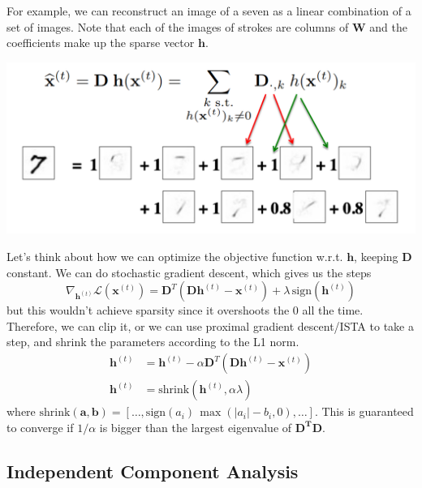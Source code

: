 \documentclass{article}
\begin{document}
    For example, we can reconstruct an image of a seven as a linear combination of a set of images. Note that each of the images of strokes are columns of $\mathbf{W}$ and the coefficients make up the sparse vector $\mathbf{h}$. 
    \begin{center}
        \includegraphics[scale=0.4]{img/sparse_coding.png}
    \end{center}
    Let's think about how we can optimize the objective function w.r.t. $\mathbf{h}$, keeping $\mathbf{D}$ constant. We can do stochastic gradient descent, which gives us the steps
    \[\nabla_{\mathbf{h}^{(t)}} \mathcal{L}(\mathbf{x}^{(t)}) = \mathbf{D}^T (\mathbf{D} \mathbf{h}^{(t)} - \mathbf{x}^{(t)}) + \lambda \, \mathrm{sign}(\mathbf{h}^{(t)})\]
    but this wouldn't achieve sparsity since it overshoots the $0$ all the time. Therefore, we can clip it, or we can use proximal gradient descent/ISTA to take a step, and shrink the parameters according to the L1 norm. 
    \begin{align*} 
        \mathbf{h}^{(t)} & = \mathbf{h}^{(t)} - \alpha \mathbf{D}^T (\mathbf{D} \mathbf{h}^{(t)} - \mathbf{x}^{(t)}) \\
        \mathbf{h}^{(t)} & = \mathrm{shrink}(\mathbf{h}^{(t)}, \alpha \lambda)
    \end{align*}
        where $\mathrm{shrink}(\mathbf{a}, \mathbf{b}) = [\ldots, \mathrm{sign}(a_i)\, \max(|a_i| - b_i, 0), \ldots]$. This is guaranteed to converge if $1/\alpha$ is bigger than the largest eigenvalue of $\mathbf{D^T} \mathbf{D}$.  
    

  \subsection{Independent Component Analysis} 
\end{document}
